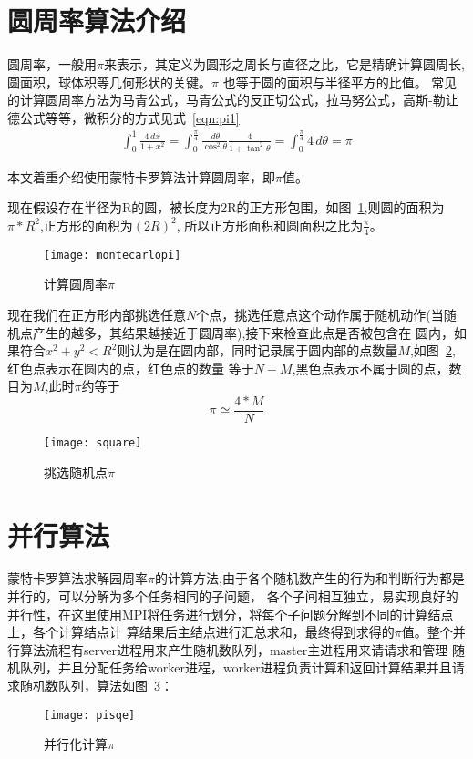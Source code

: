\section{圆周率算法介绍}
    圆周率，一般用$\pi$来表示，其定义为圆形之周长与直径之比，它是精确计算圆周长,圆面积，球体积等几何形状的关键。$\pi$
也等于圆的面积与半径平方的比值。
    常见的计算圆周率方法为马青公式，马青公式的反正切公式，拉马努公式，高斯-勒让德公式等等，微积分的方式见式~\ref{eqn:pi1}
    \begin{eqnarray}    
    \label{eqn:pi1} 
    \int_0^1 \frac{4\,dx}{1+x^2}=\int_0^\frac{\pi}{4} \frac{\,d\theta}{\cos^2\theta}\frac{4}{1+\tan^2\theta} =\int_0^\frac{\pi}{4}4\,d\theta=\pi 
    \end{eqnarray}

本文着重介绍使用蒙特卡罗算法计算圆周率，即$\pi$值。


    现在假设存在半径为R的圆，被长度为2R的正方形包围，如图~\ref{fig:pi2},则圆的面积为$\pi*R^2$,正方形的面积为$(2R)^2$,
所以正方形面积和圆面积之比为$\frac{\pi}{4}$。
    \begin{figure}[htbp]
    \centering
    \texttt{[image: montecarlopi]}
    \caption{计算圆周率$\pi$}\label{fig:pi2}
    \vspace{\baselineskip}
    \end{figure}

现在我们在正方形内部挑选任意$N$个点，挑选任意点这个动作属于随机动作(当随机点产生的越多，其结果越接近于圆周率),接下来检查此点是否被包含在
圆内，如果符合$x^2+y^2 < R^2$则认为是在圆内部，同时记录属于圆内部的点数量$M$,如图~\ref{fig:pi3},红色点表示在圆内的点，红色点的数量
等于$N-M$,黑色点表示不属于圆的点，数目为$M$,此时$\pi$约等于
    \[ \pi \simeq \frac{4*M}{N} \]
    
    \begin{figure}[htbp]
    \centering
    \texttt{[image: square]}
    \caption{挑选随机点$\pi$}\label{fig:pi3}
    \vspace{\baselineskip}
    \end{figure}

\section{并行算法}
        
    蒙特卡罗算法求解园周率$\pi$的计算方法,由于各个随机数产生的行为和判断行为都是并行的，可以分解为多个任务相同的子问题，
各个子间相互独立，易实现良好的并行性，在这里使用MPI将任务进行划分，将每个子问题分解到不同的计算结点上，各个计算结点计
算结果后主结点进行汇总求和，最终得到求得的$\pi$值。整个并行算法流程有server进程用来产生随机数队列，master主进程用来请请求和管理
随机队列，并且分配任务给worker进程，worker进程负责计算和返回计算结果并且请求随机数队列，算法如图~\ref{fig:pisqe}：
    \begin{figure}[ht]
    \centering
    \texttt{[image: pisqe]}
    \caption{并行化计算$\pi$}\label{fig:pisqe}
    \vspace{\baselineskip}
    \end{figure}



